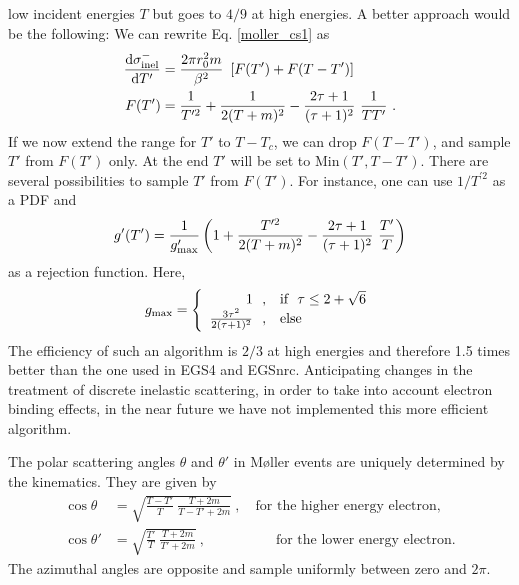low incident energies $T$ but goes to $4/9$ at high energies. 
A better approach would be the following: We can rewrite 
Eq. \eqref{moller_cs1} as 
\begin{equation}
\begin{split}
{{\rm d} \sigma_{\rm inel}^- \over  {\rm d}T'} & = 
{2 \pi r_0^2 m \over \beta^2}~ \left[ F(T') + F(T-T') \right] \\
F(T') &= \frac{1}{T^{\prime 2}} + {1 \over 2 (T+m)^2} - 
{2 \tau + 1 \over (\tau+1)^2}~\frac{1}{T T'} ~.
\end{split}
\end{equation}
If we now extend the range for $T'$ to $T-T_c$, we can drop 
$F(T-T')$, and sample $T'$ from $F(T')$ only. At the end 
$T'$ will be set to Min$(T',T-T')$. There are several possibilities 
to sample $T'$ from $F(T')$. For instance, one can use 
$1/T^{\prime 2}$ as a PDF and 
\begin{equation}
g'(T') = \frac{1}{g'_{\rm max}} \left(1 + {T^{\prime 2} \over 2 (T+m)^2} 
- {2 \tau + 1 \over (\tau + 1)^2}~ \frac{T'}{T} \right)
\end{equation}
as a rejection function. Here, 
\begin{equation}
g_{\rm max} = \left\{
\begin{array}{r@{~~, \quad}l} 
1 & \text{if}~~ \tau \le 2 + \sqrt{6} \\
{3 \tau^2 \over 2 (\tau+1)^2 } & \text{else}
\end{array} \right.
\end{equation}
The efficiency of such an algorithm is $2/3$ at high energies and 
therefore 1.5 times better than the one used in EGS4 and EGSnrc. 
Anticipating changes in the treatment of discrete inelastic 
scattering, in order to take into account electron binding 
effects, in the near future we have not implemented 
this more efficient algorithm.

The polar scattering angles $\theta$ and $\theta'$ 
in M{\o}ller events are uniquely 
determined by the kinematics. They are given by 
\begin{equation}
\label{moller_angles}
\begin{split}
\cos \theta & = \sqrt{\frac{T-T'}{T}~\frac{T+2 m}{T-T' + 2 m}}~, \quad 
\text{for the higher energy electron,} \\
\cos \theta' & = \sqrt{\frac{T'}{T}~\frac{T+2 m}{T' + 2 m}}~, \quad 
\quad \quad \quad \quad  \text{for the lower energy electron.}
\end{split}
\end{equation}
The azimuthal angles are opposite and sample uniformly between 
zero and $2 \pi$.


